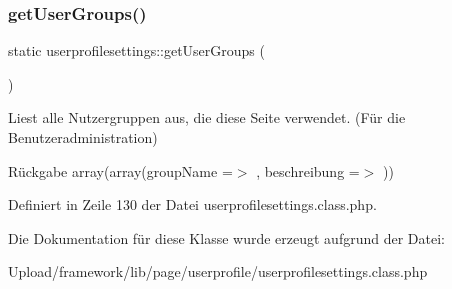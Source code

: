 \mbox{\label{classuserprofilesettings_a008efc76482f2a8c7463725fb6010fac}} 
\subsubsection{\texorpdfstring{get\+User\+Groups()}{getUserGroups()}}
{\footnotesize\ttfamily static userprofilesettings\+::get\+User\+Groups (\begin{DoxyParamCaption}{ }\end{DoxyParamCaption})\hspace{0.3cm}{\ttfamily [static]}}

Liest alle Nutzergruppen aus, die diese Seite verwendet. (Für die Benutzeradministration) \begin{DoxyReturn}{Rückgabe}
array(array(\textquotesingle{}group\+Name\textquotesingle{} =$>$ \textquotesingle{}\textquotesingle{}, \textquotesingle{}beschreibung\textquotesingle{} =$>$ \textquotesingle{}\textquotesingle{})) 
\end{DoxyReturn}


Definiert in Zeile 130 der Datei userprofilesettings.\+class.\+php.



Die Dokumentation für diese Klasse wurde erzeugt aufgrund der Datei\+:\begin{DoxyCompactItemize}
\item 
Upload/framework/lib/page/userprofile/userprofilesettings.\+class.\+php\end{DoxyCompactItemize}
